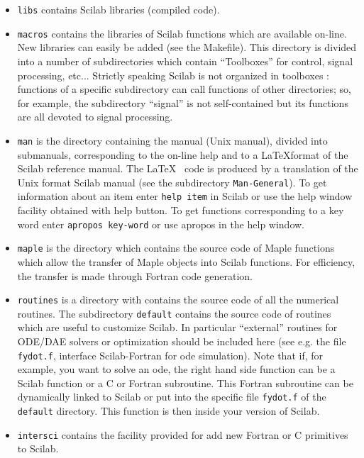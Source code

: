 \begin{itemize}
\item{{\tt libs} contains Scilab libraries (compiled code).}

\item{{\tt macros} contains the libraries of Scilab functions
which are available on-line. New libraries can easily be added 
(see the Makefile). This directory is divided into a number of subdirectories
which contain ``Toolboxes'' for control, signal processing, etc... Strictly
speaking Scilab is not organized in toolboxes : functions of a specific
subdirectory can call functions of other directories; so, for example, the 
subdirectory ``signal'' is not self-contained but its functions are all devoted
to signal processing.}

\item{{\tt man} is the directory containing the manual (Unix manual), divided 
into submanuals, corresponding to the on-line help and to 
a \LaTeX format of the Scilab reference manual. The \LaTeX~ code is produced 
by a 
translation of the Unix format Scilab manual (see the subdirectory
{\tt Man-General}).}
To get information about an item enter {\tt help item} in Scilab
or use the help window facility obtained with help button.
To get functions corresponding to a key word enter {\tt apropos
key-word} or use apropos in the help window.

\item{{\tt maple} is the directory which contains the source code of Maple
functions which allow the transfer of Maple objects
into Scilab functions. For efficiency, the transfer
is made through Fortran code generation.}

\item{{\tt routines} is a directory with contains the source code of all
the numerical routines. The subdirectory {\tt default} contains the
source code of routines which are useful to customize Scilab.}
In particular ``external'' routines for ODE/DAE solvers or optimization
should be included here (see e.g. the file {\tt fydot.f}, interface
Scilab-Fortran for ode simulation). Note that if, for example, you want
to solve an ode, the right hand side function can be a Scilab function or a C 
or 
Fortran subroutine. This Fortran subroutine can be dynamically linked
to Scilab or put into the specific file {\tt fydot.f} of the
{\tt default} directory. This function is then inside your version of Scilab.

\item{{\tt intersci} contains the facility provided for add new Fortran or C 
primitives to Scilab.}



\end{itemize}

